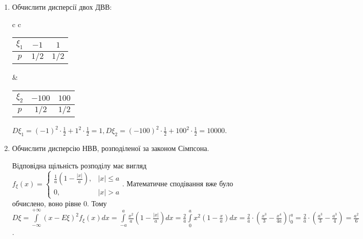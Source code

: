 \begin{example}
    \begin{enumerate}
        \item Обчислити дисперсії двох ДВВ:
        
        \begin{tabular}{c c}
            \begin{tabular}{c|c|c}
                $\xi_1$ & $-1$ & $1$ \\ 
                \hline
                $p$ & $1/2$ & $1/2$
            \end{tabular} &
            \begin{tabular}{c|c|c}
                $\xi_2$ & $-100$ & $100$ \\ 
                \hline
                $p$ & $1/2$ & $1/2$
            \end{tabular}
        \end{tabular}
        
        $D\xi_1 = (-1)^2\cdot \frac{1}{2} + 1^2\cdot \frac{1}{2} = 1, D\xi_2 = (-100)^2\cdot \frac{1}{2} + 100^2\cdot \frac{1}{2} = 10000$.
        \item Обчислити дисперсію НВВ, розподіленої за законом Сімпсона.
        
        Відповідна щільність розподілу має вигляд $f_\xi(x) = \begin{cases}
            \frac{1}{a} \left(1 - \frac{|x|}{a}\right), & |x| \leq a \\
            0, & |x| > a
        \end{cases}$.
        Математичне сподівання вже було обчислено, воно рівне 0. Тому $D\xi = \int\limits_{-\infty}^{+\infty} \left(x-E\xi\right)^2 f_\xi(x)dx =
        \int\limits_{-a}^a \frac{x^2}{a}\left(1 - \frac{|x|}{a}\right)dx = \frac{2}{a}\int\limits_0^a {x^2}\left(1 - \frac{x}{a}\right)dx =
        \frac{2}{a}\cdot \left( \frac{x^3}{3} - \frac{x^4}{4a}\right)\Bigr\vert_0^a = \frac{2}{a} \cdot \left( \frac{a^3}{3} - \frac{a^3}{4}\right) = \frac{a^2}{6}$.
    \end{enumerate}
\end{example}

